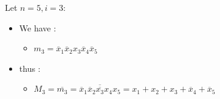 \documentclass[12pt,openany]{book}
\begin{document}
			      	Let $n=5, i=3$:
			      	\begin{itemize}
			      		\item[]We have :
			      		      \begin{itemize}
			      		      	\item[] $m_3 = \overline{x}_1 \overline{x}_2 x_3 \overline{x}_4 \overline{x}_5$
			      		      \end{itemize}
			      		\item[]thus :
			      		      \begin{itemize}
			      		      	\item[] $M_3 = \overline{m_3} =  \overline{\overline{x}_1 \overline{x}_2 \overline{x_3} x_4 x_5} = x_1 + x_2 + x_3 + \overline{x}_4 + \overline{x}_5$ \newline
			      		      \end{itemize}
			      	\end{itemize}
\end{document}
